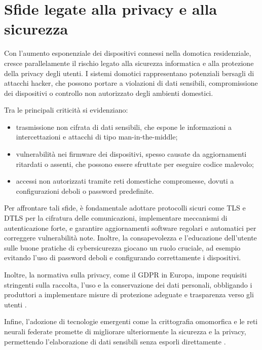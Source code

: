 \section{Sfide legate alla privacy e alla sicurezza}
Con l’aumento esponenziale dei dispositivi connessi nella domotica residenziale, cresce parallelamente il rischio legato alla sicurezza informatica e alla protezione della privacy degli utenti. I sistemi domotici rappresentano potenziali bersagli di attacchi hacker, che possono portare a violazioni di dati sensibili, compromissione dei dispositivi o controllo non autorizzato degli ambienti domestici.

Tra le principali criticità si evidenziano:
\begin{itemize}
    \item trasmissione non cifrata di dati sensibili, che espone le informazioni a intercettazioni e attacchi di tipo man-in-the-middle;
    \item vulnerabilità nei firmware dei dispositivi, spesso causate da aggiornamenti ritardati o assenti, che possono essere sfruttate per eseguire codice malevolo;
    \item accessi non autorizzati tramite reti domestiche compromesse, dovuti a configurazioni deboli o password predefinite.
\end{itemize}

Per affrontare tali sfide, è fondamentale adottare protocolli sicuri come TLS e DTLS per la cifratura delle comunicazioni, implementare meccanismi di autenticazione forte, e garantire aggiornamenti software regolari e automatici per correggere vulnerabilità note. Inoltre, la consapevolezza e l’educazione dell’utente sulle buone pratiche di cybersicurezza giocano un ruolo cruciale, ad esempio evitando l’uso di password deboli e configurando correttamente i dispositivi.

Inoltre, la normativa sulla privacy, come il GDPR in Europa, impone requisiti stringenti sulla raccolta, l’uso e la conservazione dei dati personali, obbligando i produttori a implementare misure di protezione adeguate e trasparenza verso gli utenti \parencite{nistIotSecurity, gdpr2016}.

Infine, l’adozione di tecnologie emergenti come la crittografia omomorfica e le reti neurali federate promette di migliorare ulteriormente la sicurezza e la privacy, permettendo l’elaborazione di dati sensibili senza esporli direttamente \parencite{liu2022homomorphic}.

